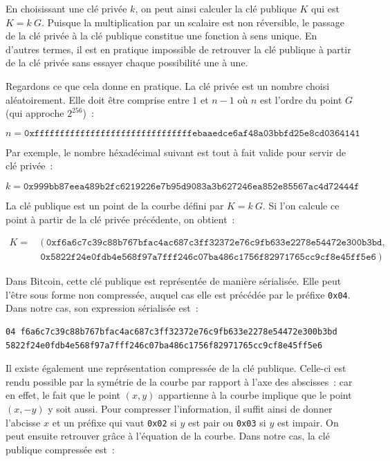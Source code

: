En choisissant une clé privée $k$, on peut ainsi calculer la clé publique $K$ qui est $K = k~G$. Puisque la multiplication par un scalaire est non réversible, le passage de la clé privée à la clé publique constitue une fonction à sens unique. En d'autres termes, il est en pratique impossible de retrouver la clé publique à partir de la clé privée sans essayer chaque possibilité une à une.


Regardons ce que cela donne en pratique. La clé privée est un nombre choisi aléatoirement. Elle doit être comprise entre $1$ et $n - 1$ où $n$ est l'ordre du point $G$ (qui approche $2^{256}$)~: 

{ \scriptsize
\[
n = \mathtt{0xfffffffffffffffffffffffffffffffebaaedce6af48a03bbfd25e8cd0364141}
\]
}

Par exemple, le nombre héxadécimal suivant est tout à fait valide pour servir de clé privée~:

{ \scriptsize
\[
k = \mathtt{0x999bb87eea489b2fc6219226e7b95d9083a3b627246ea852e85567ac4d72444f}
\]
}


La clé publique est un point de la courbe défini par $K = k~G$. Si l'on calcule ce point à partir de la clé privée précédente, on obtient~:

{ \scriptsize
\begin{align*}
K = &~(~\mathtt{0xf6a6c7c39c88b767bfac4ac687c3ff32372e76c9fb633e2278e54472e300b3bd}, \\
    &~\mathtt{0x5822f24e0fdb4e568f97a7fff246c07ba486c1756f82971765cc9cf8e45ff5e6}~)
\end{align*}
}

Dans Bitcoin, cette clé publique est représentée de manière sérialisée. Elle peut l'être sous forme non compressée, auquel cas elle est précédée par le préfixe \texttt{0x04}. Dans notre cas, son expression sérialisée est~:

\begin{Verbatim}[fontsize=\scriptsize]
04 f6a6c7c39c88b767bfac4ac687c3ff32372e76c9fb633e2278e54472e300b3bd
5822f24e0fdb4e568f97a7fff246c07ba486c1756f82971765cc9cf8e45ff5e6
\end{Verbatim}

Il existe également une représentation compressée de la clé publique. Celle-ci est rendu possible par la symétrie de la courbe par rapport à l'axe des abscisses~: car en effet, le fait que le point $(x, y)$ appartienne à la courbe implique que le point $(x, - y)$ y soit aussi. Pour compresser l'information, il suffit ainsi de donner l'abcisse $x$ et un préfixe qui vaut \texttt{0x02} si $y$ est pair ou \texttt{0x03} si $y$ est impair. On peut ensuite retrouver grâce à l'équation de la courbe. Dans notre cas, la clé publique compressée est~:

